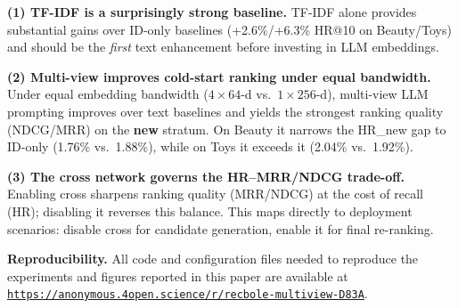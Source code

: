 \documentclass[sigconf,natbib=true,anonymous]{acmart}
\newcommand{\tfidf}{\textsc{TF-IDF}\xspace}
\newcommand{\llm}{\textsc{LLM}\xspace}
\begin{document}
\textbf{(1) TF-IDF is a surprisingly strong baseline.}
\tfidf alone provides substantial gains over ID-only baselines
(+2.6\%/+6.3\% HR@10 on Beauty/Toys) and should be the
\emph{first} text enhancement before investing in \llm embeddings.

\textbf{(2) Multi-view improves cold-start ranking under equal bandwidth.}
Under equal embedding bandwidth ($4{\times}64$-d vs.\ $1{\times}256$-d),
multi-view \llm prompting improves over text baselines and yields the
strongest ranking quality (NDCG/MRR) on the \textbf{new} stratum.
On Beauty it narrows the HR\_new gap to ID-only
(1.76\% vs.\ 1.88\%), while on Toys it exceeds it
(2.04\% vs.\ 1.92\%).

\textbf{(3) The cross network governs the HR--MRR/NDCG trade-off.}
Enabling cross sharpens ranking quality (MRR/NDCG) at the cost of
recall (HR); disabling it reverses this balance. This maps directly
to deployment scenarios: disable cross for candidate generation,
enable it for final re-ranking.

\smallskip\noindent
\textbf{Reproducibility.} All code and configuration files needed to
reproduce the experiments and figures reported in this paper are available at
\texttt{\url{https://anonymous.4open.science/r/recbole-multiview-D83A}}.




\end{document}
